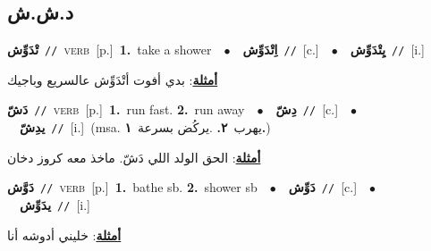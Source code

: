 \documentclass[10pt,a4paper,twoside]{article} %
\begin{document}
\begin{multicols}{2}
\vspace{-3mm}
\subsection*{\color{blue}\foreignlanguage{arabic}{د.ش.ش}\color{blue}{}} 

{\setlength\topsep{0pt}\textbf{\foreignlanguage{arabic}{تْدَوِّش}}\ {\color{gray}\texttt{//}\color{black}}\ \textsc{verb}\ [p.]\ \textbf{1.}~take a shower\ \ $\bullet$\ \ \setlength\topsep{0pt}\textbf{\foreignlanguage{arabic}{اِتْدَوِّش}}\ {\color{gray}\texttt{//}\color{black}}\ [c.]\ \ $\bullet$\ \ \setlength\topsep{0pt}\textbf{\foreignlanguage{arabic}{يِتْدَوِّش}}\ {\color{gray}\texttt{//}\color{black}}\ [i.]\  \begin{flushright}\color{gray}\foreignlanguage{arabic}{\textbf{\underline{\foreignlanguage{arabic}{أمثلة}}}: بدي أفوت أتْدَوِّش عالسريع وباجيك}\end{flushright}\color{black}} \vspace{2mm}

{\setlength\topsep{0pt}\textbf{\foreignlanguage{arabic}{دَشّ}}\ {\color{gray}\texttt{//}\color{black}}\ \textsc{verb}\ [p.]\ \textbf{1.}~run fast.  \textbf{2.}~run away\ \ $\bullet$\ \ \setlength\topsep{0pt}\textbf{\foreignlanguage{arabic}{دِشّ}}\ {\color{gray}\texttt{//}\color{black}}\ [c.]\ \ $\bullet$\ \ \setlength\topsep{0pt}\textbf{\foreignlanguage{arabic}{يدِشّ}}\ {\color{gray}\texttt{//}\color{black}}\ [i.]\ \color{gray}(msa. \foreignlanguage{arabic}{يهرب}~\foreignlanguage{arabic}{\textbf{٢.}}  .\foreignlanguage{arabic}{يركُض بسرعة}~\foreignlanguage{arabic}{\textbf{١.}})\color{black}\  \begin{flushright}\color{gray}\foreignlanguage{arabic}{\textbf{\underline{\foreignlanguage{arabic}{أمثلة}}}: الحق الولد اللي دَشّ. ماخذ معه كروز دخان}\end{flushright}\color{black}} \vspace{2mm}

{\setlength\topsep{0pt}\textbf{\foreignlanguage{arabic}{دَوَّش}}\ {\color{gray}\texttt{//}\color{black}}\ \textsc{verb}\ [p.]\ \textbf{1.}~bathe sb.  \textbf{2.}~shower sb\ \ $\bullet$\ \ \setlength\topsep{0pt}\textbf{\foreignlanguage{arabic}{دَوِّش}}\ {\color{gray}\texttt{//}\color{black}}\ [c.]\ \ $\bullet$\ \ \setlength\topsep{0pt}\textbf{\foreignlanguage{arabic}{يدَوِّش}}\ {\color{gray}\texttt{//}\color{black}}\ [i.]\  \begin{flushright}\color{gray}\foreignlanguage{arabic}{\textbf{\underline{\foreignlanguage{arabic}{أمثلة}}}: خليني أدوشه أنا}\end{flushright}\color{black}} \vspace{2mm}


\end{multicols}
\end{document}
